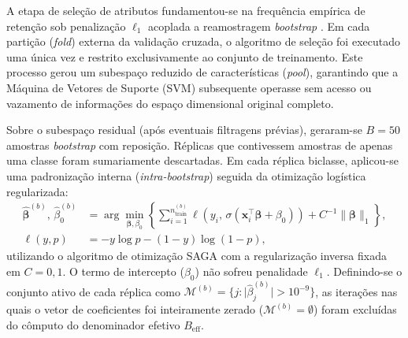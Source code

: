 \documentclass[review]{elsarticle}
\begin{document}
	A etapa de seleção de atributos fundamentou-se na frequência empírica de retenção sob penalização $\ell_1$ acoplada a reamostragem \emph{bootstrap} \citep{bach-2008,meinshausen-2010}. Em cada partição (\emph{fold}) externa da validação cruzada, o algoritmo de seleção foi executado uma única vez e restrito exclusivamente ao conjunto de treinamento. Este processo gerou um subespaço reduzido de características (\emph{pool}), garantindo que a Máquina de Vetores de Suporte (SVM) subsequente operasse sem acesso ou vazamento de informações do espaço dimensional original completo.
	
	Sobre o subespaço residual (após eventuais filtragens prévias), geraram-se $B=50$ amostras \emph{bootstrap} com reposição. Réplicas que contivessem amostras de apenas uma classe foram sumariamente descartadas. Em cada réplica biclasse, aplicou-se uma padronização interna (\emph{intra-bootstrap}) seguida da otimização logística regularizada:
	\begin{equation}
		\begin{aligned}
			\hat{\boldsymbol{\beta}}^{(b)},\,\hat{\beta}_0^{(b)}
			&= \arg\min_{\boldsymbol{\beta},\beta_0}
			\left\{
			\sum_{i=1}^{n_{\mathrm{train}}^{(b)}}
			\ell\!\left(y_i,\,\sigma(\mathbf{x}_i^{\top}\boldsymbol{\beta}+\beta_0)\right)
			+ C^{-1}\|\boldsymbol{\beta}\|_1
			\right\}, \\
			\ell(y,p) &= -y\log p-(1-y)\log(1-p),
		\end{aligned}
		\label{eq:l1-logistic}
	\end{equation}
	utilizando o algoritmo de otimização SAGA com a regularização inversa fixada em $C=0{,}1$. O termo de intercepto ($\beta_0$) não sofreu penalidade $\ell_1$. Definindo-se o conjunto ativo de cada réplica como $\mathcal{M}^{(b)} = \{j : \lvert\hat{\beta}^{(b)}_j\rvert > 10^{-9}\}$, as iterações nas quais o vetor de coeficientes foi inteiramente zerado ($\mathcal{M}^{(b)} = \emptyset$) foram excluídas do cômputo do denominador efetivo $B_{\mathrm{eff}}$.
	
\end{document}
